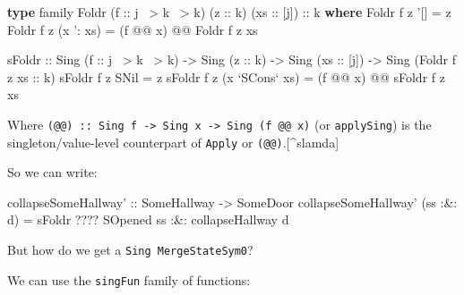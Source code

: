 \documentclass[]{article}
\newenvironment{Shaded}{}{}
\newcommand{\DataTypeTok}[1]{\textcolor[rgb]{0.56,0.13,0.00}{#1}}
\newcommand{\FunctionTok}[1]{\textcolor[rgb]{0.02,0.16,0.49}{#1}}
\newcommand{\KeywordTok}[1]{\textcolor[rgb]{0.00,0.44,0.13}{\textbf{#1}}}
\newcommand{\NormalTok}[1]{#1}
\newcommand{\OtherTok}[1]{\textcolor[rgb]{0.00,0.44,0.13}{#1}}
\begin{document}
\begin{Shaded}
\begin{Highlighting}[]
\KeywordTok{type}\NormalTok{ family }\DataTypeTok{Foldr}\NormalTok{ (}\OtherTok{f ::}\NormalTok{ j }\FunctionTok{~>}\NormalTok{ k }\FunctionTok{~>}\NormalTok{ k) (}\OtherTok{z ::}\NormalTok{ k) (}\OtherTok{xs ::}\NormalTok{ [j])}\OtherTok{ ::}\NormalTok{ k }\KeywordTok{where}
    \DataTypeTok{Foldr}\NormalTok{ f z '[]       }\FunctionTok{=}\NormalTok{ z}
    \DataTypeTok{Foldr}\NormalTok{ f z (x '}\FunctionTok{:}\NormalTok{ xs) }\FunctionTok{=}\NormalTok{ (f }\FunctionTok{@@}\NormalTok{ x) }\FunctionTok{@@} \DataTypeTok{Foldr}\NormalTok{ f z xs}

\NormalTok{sFoldr}
\OtherTok{    ::} \DataTypeTok{Sing}\NormalTok{ (}\OtherTok{f ::}\NormalTok{ j }\FunctionTok{~>}\NormalTok{ k }\FunctionTok{~>}\NormalTok{ k)}
    \OtherTok{->} \DataTypeTok{Sing}\NormalTok{ (}\OtherTok{z ::}\NormalTok{ k)}
    \OtherTok{->} \DataTypeTok{Sing}\NormalTok{ (}\OtherTok{xs ::}\NormalTok{ [j])}
    \OtherTok{->} \DataTypeTok{Sing}\NormalTok{ (}\DataTypeTok{Foldr}\NormalTok{ f z}\OtherTok{ xs ::}\NormalTok{ k)}
\NormalTok{sFoldr f z }\DataTypeTok{SNil}           \FunctionTok{=}\NormalTok{ z}
\NormalTok{sFoldr f z (x }\OtherTok{`SCons`}\NormalTok{ xs) }\FunctionTok{=}\NormalTok{ (f }\FunctionTok{@@}\NormalTok{ x) }\FunctionTok{@@}\NormalTok{ sFoldr f z xs}
\end{Highlighting}
\end{Shaded}

Where
\texttt{(@@)\ ::\ Sing\ f\ -\textgreater{}\ Sing\ x\ -\textgreater{}\ Sing\ (f\ @@\ x)}
(or \texttt{applySing}) is the singleton/value-level counterpart of
\texttt{Apply} or \texttt{(@@)}.{[}\^{}slamda{]}

So we can write:

\begin{Shaded}
\begin{Highlighting}[]
\OtherTok{collapseSomeHallway' ::} \DataTypeTok{SomeHallway} \OtherTok{->} \DataTypeTok{SomeDoor}
\NormalTok{collapseSomeHallway' (ss }\FunctionTok{:&:}\NormalTok{ d) }\FunctionTok{=}\NormalTok{ sFoldr }\FunctionTok{????} \DataTypeTok{SOpened}\NormalTok{ ss}
                              \FunctionTok{:&:}\NormalTok{ collapseHallway d}
\end{Highlighting}
\end{Shaded}

But how do we get a \texttt{Sing\ MergeStateSym0}?

We can use the \texttt{singFun} family of functions:
\end{document}
